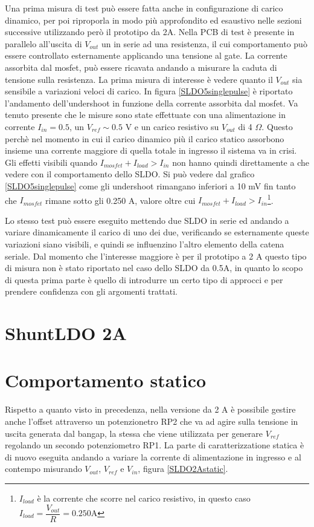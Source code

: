 Una prima misura di test può essere fatta anche in configurazione di carico dinamico, per poi riproporla in modo più approfondito ed esaustivo nelle sezioni successive utilizzando però il prototipo da 2A.
Nella PCB di test è presente in parallelo all'uscita di $V_{out}$ un in serie ad una resistenza, il cui comportamento può essere controllato esternamente applicando una tensione al gate. 
La corrente assorbita dal mosfet, può essere ricavata andando a misurare la caduta di tensione sulla resistenza. La prima misura di interesse è vedere quanto il $V_{out}$ sia sensibile a variazioni veloci di carico. In figura \ref{SLDO5singlepulse} è riportato l'andamento dell'undershoot in funzione della corrente assorbita dal mosfet. Va tenuto presente che le misure sono state effettuate con una alimentazione in corrente $I_{in} = 0.5$, un $V_{ref} \sim 0.5$ V e un carico resistivo su $V_{out}$ di 4 $\Omega$. Questo perchè nel momento in cui il carico dinamico più il carico statico assorbono insieme una corrente maggiore di quella totale in ingresso il sistema va in crisi. Gli effetti visibili quando $I_{mosfet} + I_{load} > I_{in}$ non hanno quindi direttamente a che vedere con il comportamento dello SLDO. Si può vedere dal grafico \ref{SLDO5singlepulse} come gli undershoot rimangano inferiori a 10 mV fin tanto che $I_{mosfet}$ rimane sotto gli 0.250 A, valore oltre cui $I_{mosfet} + I_{load} > I_{in}$\footnote{$I_{load}$ è la corrente che scorre nel carico resistivo, in questo caso $I_{load} = \dfrac{V_{out}}{R} = 0.250$A}. 

Lo stesso test può essere eseguito mettendo due SLDO in serie ed andando a variare dinamicamente il carico di uno dei due, verificando se esternamente queste variazioni siano visibili, e quindi se influenzino l'altro elemento della catena seriale. 
Dal momento che l'interesse maggiore è per il prototipo a 2 A questo tipo di misura non è stato riportato nel caso dello SLDO da 0.5A, in quanto lo scopo di questa prima parte è quello di introdurre un certo tipo di approcci e per prendere confidenza con gli argomenti trattati.

\section{ShuntLDO 2A}

\section{Comportamento statico}
Rispetto a quanto visto in precedenza, nella versione da 2 A è possibile gestire anche l'offset attraverso un potenzionetro RP2 che va ad agire sulla tensione in uscita generata dal bangap, la stessa che viene utilizzata per generare $V_{ref}$ regolando un secondo potenziometro RP1. La parte di caratterizzatione statica è di nuovo eseguita andando a variare la corrente di alimentazione in ingresso e al contempo misurando $V_{out}$, $V_{ref}$ e $V_{in}$, figura \ref{SLDO2Astatic}.

